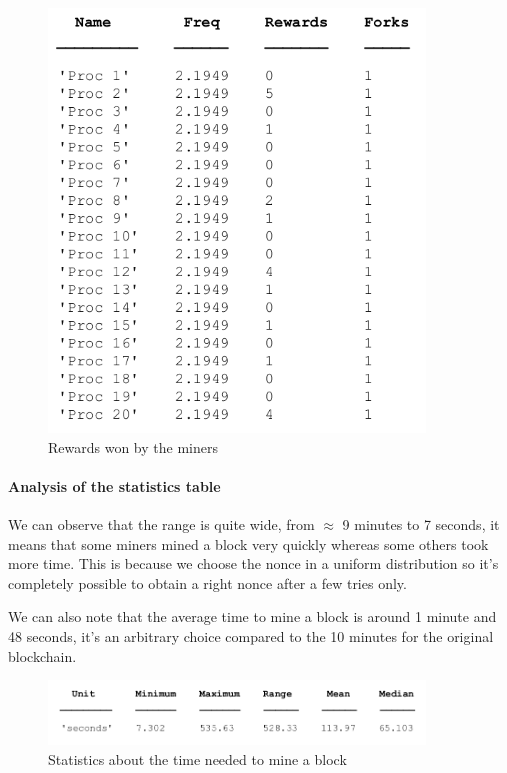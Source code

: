 \begin{figure}[ht]
\centering
\includegraphics[width=10cm]{Figures/rewards}
\caption{Rewards won by the miners}
\end{figure}
\medskip

\paragraph{Analysis of the statistics table}

We can observe that the range is quite wide, from $\approx$ 9 minutes to 7 seconds, it means that some miners mined a block very quickly whereas some others took more time. This is because we choose the nonce in a uniform distribution so it's completely possible to obtain a right nonce after a few tries only. \newline

We can also note that the average time to mine a block is around 1 minute and 48 seconds, it's an arbitrary choice compared to the 10 minutes for the original blockchain.
\clearpage

\begin{figure}[ht]
\centering
\includegraphics[width=10cm]{Figures/stats}
\caption{Statistics about the time needed to mine a block}
\end{figure}
\medskip



